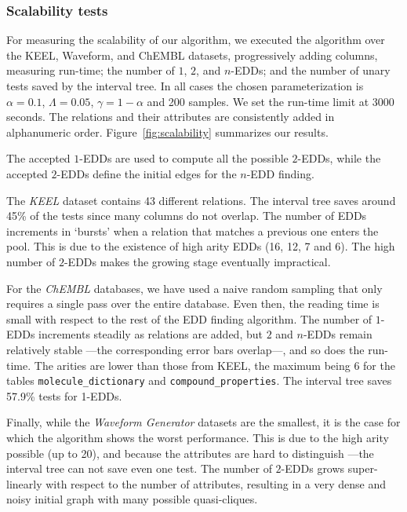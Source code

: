 \subsubsection{Scalability tests}
\label{sec:scalability}

For measuring the scalability of our algorithm, we executed the algorithm over the KEEL, Waveform, and ChEMBL datasets, progressively adding columns, measuring run-time; the
number of $1$, $2$, and $n$-EDDs; and the number of unary tests saved by the interval
tree.
In all cases the chosen parameterization is $\alpha=0.1$, $\Lambda = 0.05$,
$\gamma = 1 - \alpha$ and 200 samples. We set the run-time limit at 3000 seconds.
The relations and their attributes are consistently added in alphanumeric order.
Figure~\ref{fig:scalability} summarizes our results.

The accepted $1$-EDDs are used to compute all the possible $2$-EDDs, while the accepted $2$-EDDs
define the initial edges for the $n$-EDD finding.


The \emph{KEEL} dataset contains 43 different relations. The interval tree saves around 45\% of
the tests since many columns do not overlap. The number of EDDs increments in `bursts' when a
relation that matches a previous one enters the pool. This is due to the existence of
high arity EDDs (16, 12, 7 and 6).
The high number of $2$-EDDs makes the growing stage eventually impractical.

For the \emph{ChEMBL} databases, we have used a naive random sampling that only requires a single
pass over the entire database. Even then, the reading time is small with respect to the rest of the EDD
finding algorithm. The number of $1$-EDDs increments steadily as relations are added, but $2$
and $n$-EDDs remain relatively stable ---the corresponding error bars overlap---, and so does the run-time.
The arities are lower than those from KEEL, the maximum being 6 for the tables \texttt{molecule\_dictionary}
and \texttt{compound\_properties}. The interval tree saves 57.9\% tests for 1-EDDs.

Finally, while the \emph{Waveform Generator} datasets are the smallest, it is the case for which the
algorithm shows the worst performance. This is due to the high arity possible (up to 20), and 
because the attributes are hard to distinguish ---the interval tree can not save even one test. The
number of $2$-EDDs grows super-linearly with respect to the number of attributes, resulting in a very
dense and noisy initial graph with many possible quasi-cliques.

